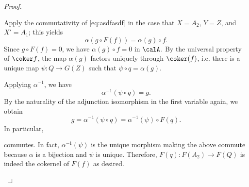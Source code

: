 \begin{proof}
\begin{enumerate}
        Apply the commutativity of \eqref{eq:asdfasdf} in the case that $X = A_2$, $Y = Z$, and $X' = A_1$; this yields
        $$\alpha(g \circ F(f)) = \alpha(g) \circ f.$$
        Since $g \circ F(f) = 0$, we have $\alpha(g) \circ f = 0$ in $\calA$. By the universal property of $\coker f$, the map $\alpha(g)$ factors uniquely through $\coker(f)$, i.e. there is a unique map $\psi: Q \to G(Z)$ such that $\psi \circ q = \alpha(g)$.
        \begin{center}
        \end{center}
        Applying $\alpha^{-1}$, we have 
        $$\alpha^{-1}(\psi \circ q) = g.$$
        By the naturality of the adjunction isomorphism in the first variable again, we obtain 
        $$g = \alpha^{-1}(\psi \circ q) = \alpha^{-1}(\psi) \circ F(q).$$
        In particular, 
        \begin{center}
        \end{center}
        commutes. In fact, $\alpha^{-1}(\psi)$ is the unique morphism making the above commute because $\alpha$ is a bijection and $\psi$ is unique. Therefore, $F(q): F(A_2) \to F(Q)$ is indeed the cokernel of $F(f)$ as desired.
    \end{enumerate}
\end{proof}